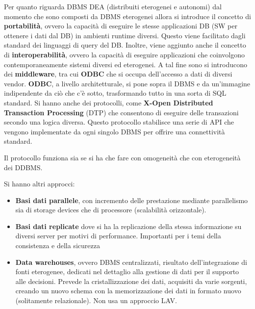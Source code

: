 Per quanto riguarda DBMS DEA (distribuiti eterogenei e autonomi) dal momento che
sono composti da DBMS eterogenei allora si introduce il concetto di \textbf{portabilità},
ovvero la capacità di eseguire le stesse applicazioni DB (SW per ottenere i dati dal DB)
in ambienti runtime diversi. Questo viene facilitato dagli standard dei linguaggi
di query del DB.
Inoltre, viene aggiunto anche il concetto di \textbf{interoperabilità}, ovvero
la capacità di eseguire applicazioni che coinvolgono contemporaneamente sistemi
diversi ed eterogenei. A tal fine sono si introducono dei \textbf{middleware}, tra cui \textbf{ODBC} che si occupa dell'accesso a dati
di diversi vendor. \textbf{ODBC}, a livello architetturale, si pone sopra il DBMS e da
un'immagine indipendente da ciò che c'è sotto, trasformando tutto in una sorta
di SQL standard. Si hanno anche dei protocolli, come \textbf{X-Open Distributed
    Transaction Processing} (DTP) che consentono di eseguire delle transazioni secondo
una logica diversa. Questo protocollo stabilisce una serie di API che vengono
implementate da ogni singolo DBMS per offrire una connettività standard.

Il protocollo funziona sia se si ha che fare con omogeneità che con eterogeneità dei DDBMS.


Si hanno altri approcci:
\begin{itemize}
    \item \textbf{Basi dati parallele}, con incremento delle prestazione
          mediante parallelismo sia di storage devices che di processore
          (scalabilità orizzontale).
    \item \textbf{Basi dati replicate} dove si ha la replicazione della stessa
          informazione su diversi server per motivi di performance. Importanti
          per i temi della consistenza e della sicurezza
    \item \textbf{Data warehouses}, ovvero DBMS centralizzati, risultato
          dell'integrazione di fonti eterogenee, dedicati nel dettaglio alla
          gestione di dati per il supporto alle decisioni. Prevede la
          cristallizzazione dei dati, acquisiti da varie sorgenti, creando un
          nuovo schema con la memorizzazione dei dati in formato nuovo
          (solitamente relazionale). Non usa un approccio LAV.
\end{itemize}

